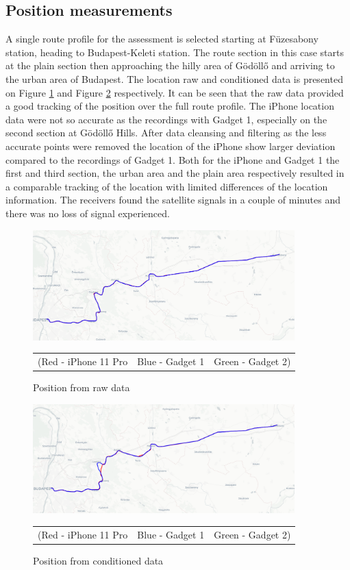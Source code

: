 \documentclass{article}
\begin{document}
		\subsection{Position measurements}
			A single route profile for the assessment is selected starting at Füzesabony station, heading to Budapest-Keleti station. The route section in this case starts at the plain section then approaching the hilly area of Gödöllő and arriving to the urban area of Budapest. The location raw and conditioned data is presented on Figure \ref{fig:raw_map} and Figure \ref{fig:cond_map} respectively. It can be seen that the raw data provided a good tracking of the position over the full route profile. The iPhone location data were not so accurate as the recordings with Gadget 1, especially on the second section at Gödöllő Hills. After data cleansing and filtering as the less accurate points were removed the location of the iPhone show larger deviation compared to the recordings of Gadget 1. Both for the iPhone and Gadget 1 the first and third section, the urban area and the plain area respectively resulted in a comparable tracking of the location with limited differences of the location information. The receivers found the satellite signals in a couple of minutes and there was no loss of signal experienced.
			\begin{figure}[h]
				\centering
		      \includegraphics[width=0.9\textwidth]{raw_map.png}
		      \caption{Position from raw data}
		      \begin{tabular}{c c c}
			   		\footnotesize (Red - iPhone 11 Pro & \footnotesize Blue - Gadget 1 & \footnotesize Green - Gadget 2)
		      \end{tabular} 
		      \label{fig:raw_map}
			\end{figure}
			\begin{figure}[h]
				\centering
		   		\includegraphics[width=0.9\textwidth]{cond_map.png}
		   		\caption{Position from conditioned data}
		   		\begin{tabular}{c c c}
					\footnotesize (Red - iPhone 11 Pro & \footnotesize Blue - Gadget 1 & \footnotesize Green - Gadget 2)
		      \end{tabular} 
		      \label{fig:cond_map}
			\end{figure}
\end{document}

